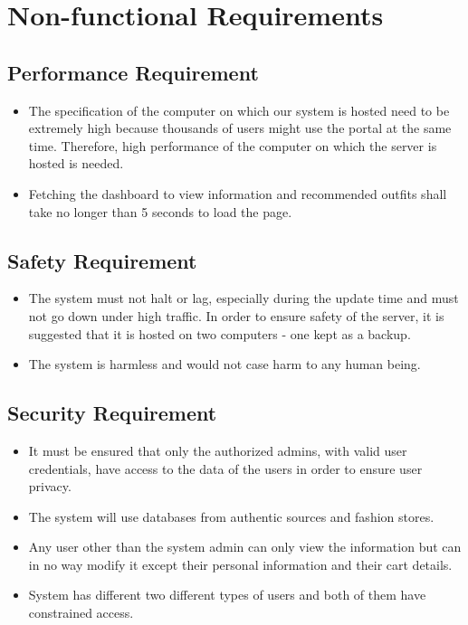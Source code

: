 
\section{Non-functional Requirements}

\subsection{Performance Requirement}

\begin{itemize}
    \item The specification of the computer on which our system is hosted need to be extremely high because thousands of users might use the portal at the same time. Therefore, high performance of the computer on which the server is hosted is needed.
    
    \item Fetching the dashboard to view information and recommended outfits shall take no longer than 5 seconds to load the page.
\end{itemize}

\subsection{Safety Requirement}
\begin{itemize}
    \item The system must not halt or lag, especially during the update time and must not go down under high traffic. In order to ensure safety of the server, it is suggested that it is hosted on two computers - one kept as a backup.
    
    \item The system is harmless and would  not case harm to any human being.
\end{itemize}

\subsection{Security Requirement}
\begin{itemize}
    \item It must be ensured that only the authorized admins, with valid user credentials, have access to the data of the users in order to ensure user privacy. 
    
    \item The system will use databases from authentic sources and fashion stores.
    
    \item Any user other than the system admin can only view the information but can in no  way modify it except their personal information and their cart details.
    
    \item System has different two different types of users and both of them have constrained access. 
\end{itemize}

